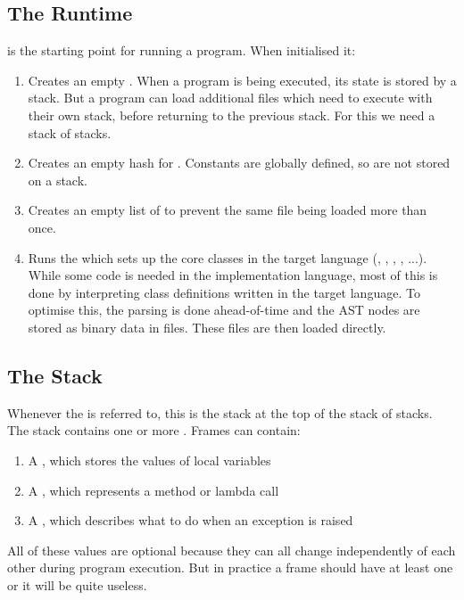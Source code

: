 \subsection{The Runtime}

 is the starting point for running a program. When initialised it:

\begin{enumerate}
  \item Creates an empty . When a program is being executed, its state is stored by a stack. But a program can load additional files which need to execute with their own stack, before returning to the previous stack. For this we need a stack of stacks.
  \item Creates an empty hash for . Constants are globally defined, so are not stored on a stack.
  \item Creates an empty list of  to prevent the same file being loaded more than once.
  \item Runs the  which sets up the core classes in the target language (, , , , ...). While some code is needed in the implementation language, most of this is done by interpreting class definitions written in the target language. To optimise this, the parsing is done ahead-of-time and the AST nodes are stored as binary data in files. These files are then loaded directly.
\end{enumerate}

\subsection{The Stack}

Whenever the  is referred to, this is the stack at the top of the stack of stacks. The stack contains one or more . Frames can contain:

\begin{enumerate}
  \item A , which stores the values of local variables
  \item A , which represents a method or lambda call
  \item A , which describes what to do when an exception is raised
\end{enumerate}

All of these values are optional because they can all change independently of each other during program execution. But in practice a frame should have at least one or it will be quite useless.

